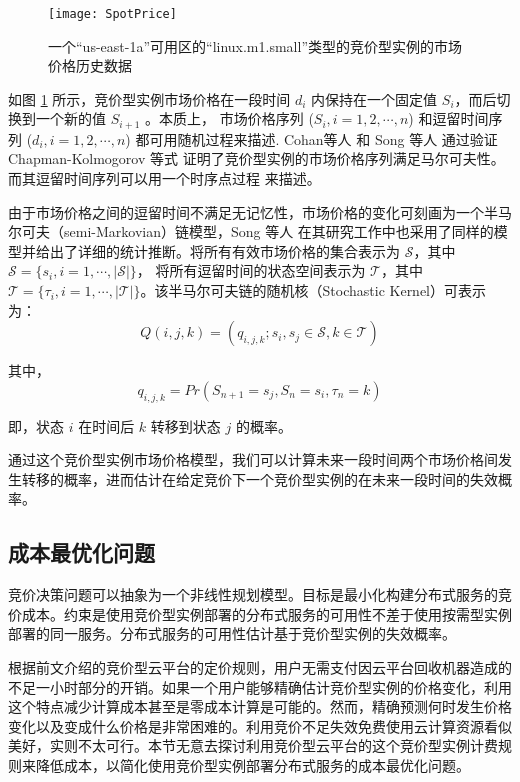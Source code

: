 \begin{figure}
  \centering
  \texttt{[image: SpotPrice]}
  \caption{一个``us-east-1a''可用区的``linux.m1.small''类型的竞价型实例的市场价格历史数据}
  \label{figure:sil}
\end{figure}

如图 \ref{figure:sil} 所示，竞价型实例市场价格在一段时间 $d_i$ 内保持在一个固定值 $S_{i}$，而后切换到一个新的值 $S_{i+1}$ 。本质上，
市场价格序列 ($S_i, i = 1, 2, \cdots, n$) 和逗留时间序列 ($d_i, i = 1, 2, \cdots, n$) 都可用随机过程来描述. Cohan等人 \cite{chohan2010see} 和 Song 等人 \cite{song2012optimal} 通过验证 Chapman-Kolmogorov 等式 \cite{grimmett1992probability} 证明了竞价型实例的市场价格序列满足马尔可夫性。而其逗留时间序列可以用一个时序点过程 \cite{eltit} 来描述。

由于市场价格之间的逗留时间不满足无记忆性，市场价格的变化可刻画为一个半马尔可夫（semi-Markovian）链模型，Song 等人 \cite{song2012optimal} 在其研究工作中也采用了同样的模型并给出了详细的统计推断。将所有有效市场价格的集合表示为 $\mathcal{S}$，其中 $\mathcal{S} = \{s_i, i = 1, \cdots, \left|\mathcal{S}\right|\}$， 将所有逗留时间的状态空间表示为 $\mathcal{T}$，其中 $\mathcal{T} = \{\tau_i, i = 1, \cdots, \left|\mathcal{T}\right|\}$。该半马尔可夫链的随机核（Stochastic Kernel）可表示为：
\begin{equation}
Q(i, j, k) = (q_{i, j, k}; s_i, s_j \in \mathcal{S}, k \in \mathcal{T})
\end{equation}

其中，
\begin{equation}
q_{i, j, k} = Pr(S_{n+1} = s_j, S_n = s_i, \tau_n = k)
\end{equation}

即，状态 $i$ 在时间后 $k$ 转移到状态 $j$ 的概率。

通过这个竞价型实例市场价格模型，我们可以计算未来一段时间两个市场价格间发生转移的概率，进而估计在给定竞价下一个竞价型实例的在未来一段时间的失效概率。

\subsection{成本最优化问题}
竞价决策问题可以抽象为一个非线性规划模型。目标是最小化构建分布式服务的竞价成本。约束是使用竞价型实例部署的分布式服务的可用性不差于使用按需型实例部署的同一服务。分布式服务的可用性估计基于竞价型实例的失效概率。

根据前文介绍的竞价型云平台的定价规则，用户无需支付因云平台回收机器造成的不足一小时部分的开销。如果一个用户能够精确估计竞价型实例的价格变化，利用这个特点减少计算成本甚至是零成本计算是可能的。然而，精确预测何时发生价格变化以及变成什么价格是非常困难的。利用竞价不足失效免费使用云计算资源看似美好，实则不太可行。本节无意去探讨利用竞价型云平台的这个竞价型实例计费规则来降低成本，以简化使用竞价型实例部署分布式服务的成本最优化问题。

